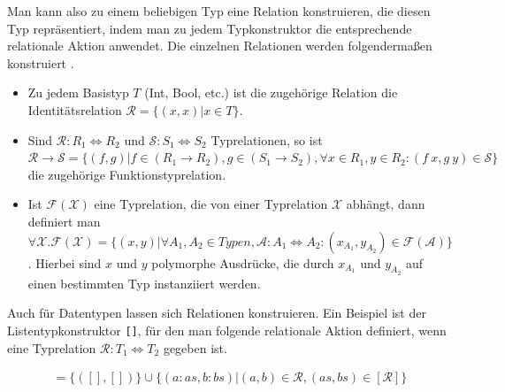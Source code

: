 

Man kann also zu einem beliebigen Typ eine Relation konstruieren, die diesen Typ repräsentiert, indem man zu jedem Typkonstruktor
die entsprechende relationale Aktion anwendet. Die einzelnen Relationen werden folgendermaßen konstruiert \cite{voigtlander}.

\begin{itemize}
\item Zu jedem Basistyp $T$ (Int, Bool, etc.) ist die zugehörige Relation die Identitätsrelation $\mathcal{R} = \{ (x, x) | x \in T\}$.
\item Sind $\mathcal{R} : R_1 \Leftrightarrow R_2$ und $\mathcal{S} : S_1 \Leftrightarrow S_2$ Typrelationen, so ist $\mathcal{R} \rightarrow \mathcal{S} = \{ (f, g) | f \in (R_1 \rightarrow R_2), g \in (S_1 \rightarrow S_2), \forall x \in R_1, y \in R_2: (f\ x, g\ y) \in \mathcal{S} \}$ die zugehörige Funktionstyprelation.
\item Ist $\mathcal{F}(\mathcal{X})$ eine Typrelation, die von einer Typrelation $\mathcal{X}$ abhängt, dann definiert man
$\forall \mathcal{X} . \mathcal{F}(\mathcal{X}) = \{ (x, y) | \forall A_1, A_2 \in Typen, \mathcal{A} : A_1 \Leftrightarrow A_2: 
(x_{A_1}, y_{A_2}) \in \mathcal{F}(\mathcal{A}) \}$. Hierbei sind $x$ und $y$ polymorphe Ausdrücke, die durch $x_{A_1}$ und
$y_{A_2}$ auf einen bestimmten Typ instanziiert werden.
\end{itemize}


Auch für Datentypen lassen sich Relationen konstruieren. Ein Beispiel ist der Listentypkonstruktor \texttt{[]}, für den man folgende
relationale Aktion definiert, wenn eine Typrelation $\mathcal{R} : T_1 \Leftrightarrow T_2$ gegeben ist.

\begin{align*}
[\mathcal{R}] = \{ ([], []) \} \cup \{ (a : as, b : bs) | (a, b) \in \mathcal{R}, (as, bs) \in [\mathcal{R}] \}
\end{align*}

